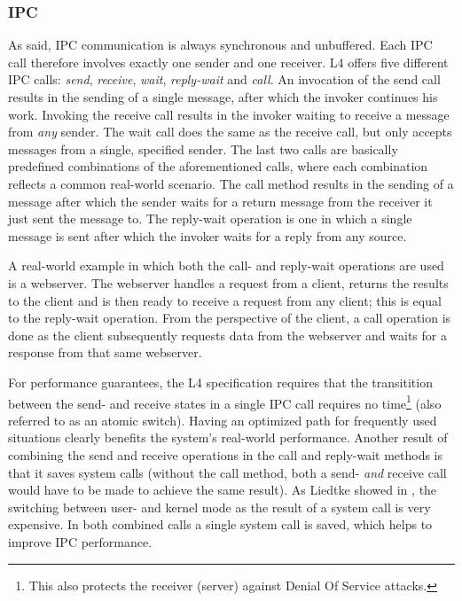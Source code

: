 \subsubsection{IPC}
As said, IPC communication is always synchronous and unbuffered. Each IPC call therefore involves exactly one sender and one receiver. L4 offers five different IPC calls: \emph{send}, \emph{receive}, \emph{wait}, \emph{reply-wait} and \emph{call}. An invocation of the send call results in the sending of a single message, after which the invoker continues his work. Invoking the receive call results in the invoker waiting to receive a message from \textit{any} sender. The wait call does the same as the receive call, but only accepts messages from a single, specified sender. The last two calls are basically predefined combinations of the aforementioned calls, where each combination reflects a common real-world scenario. The call method results in the sending of a message after which the sender waits for a return message from the receiver it just sent the message to. The reply-wait operation is one in which a single message is sent after which the invoker waits for a reply from any source.\emptyline

A real-world example in which both the call- and reply-wait operations are used is a webserver. The webserver handles a request from a client, returns the results to the client and is then ready to receive a request from any client; this is equal to the reply-wait operation. From the perspective of the client, a call operation is done as the client subsequently requests data from the webserver and waits for a response from that same webserver.\emptyline

For performance guarantees, the L4 specification requires that the transitition between the send- and receive states in a single IPC call requires no time\footnote{This also protects the receiver (server) against Denial Of Service attacks.} (also referred to as an atomic switch). Having an optimized path for frequently used situations clearly benefits the system's real-world performance. Another result of combining the send and receive operations in the call and reply-wait methods is that it saves system calls (without the call method, both a send- \textit{and} receive call would have to be made to achieve the same result). As Liedtke showed in \cite{liedtke93improve}, the switching between user- and kernel mode as the result of a system call is very expensive. In both combined calls a single system call is saved, which helps to improve IPC performance.


